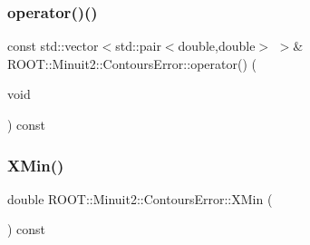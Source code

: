 \subsubsection{\texorpdfstring{operator()()}{operator()()}\hspace{0.1cm}{\footnotesize\ttfamily [4/4]}}
{\footnotesize\ttfamily const std\+::vector$<$std\+::pair$<$double,double$>$ $>$\& R\+O\+O\+T\+::\+Minuit2\+::\+Contours\+Error\+::operator() (\begin{DoxyParamCaption}\item[{void}]{ }\end{DoxyParamCaption}) const\hspace{0.3cm}{\ttfamily [inline]}}

\mbox{\label{classROOT_1_1Minuit2_1_1ContoursError_ac0dbac1ec08765a632908c88c5f24822}} 
\subsubsection{\texorpdfstring{XMin()}{XMin()}\hspace{0.1cm}{\footnotesize\ttfamily [1/2]}}
{\footnotesize\ttfamily double R\+O\+O\+T\+::\+Minuit2\+::\+Contours\+Error\+::\+X\+Min (\begin{DoxyParamCaption}{ }\end{DoxyParamCaption}) const\hspace{0.3cm}{\ttfamily [inline]}}

